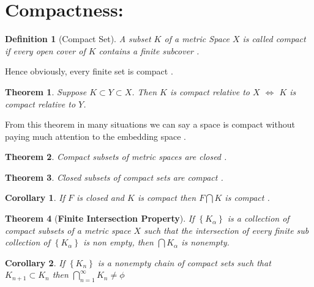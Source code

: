 \documentclass{article}
\newcommand{\set}[1]{\left\{#1\right\}}
\newtheorem{theorem}{Theorem}[section]
\newtheorem{defn}{Definition}[section]
\newtheorem{corollary}{Corollary}[theorem]
\begin{document}
\section{Compactness:}
\begin{defn}[Compact Set] A subset $K$ of a metric Space $X$ is called compact if every open cover of $K$ contains a finite subcover . 
\end{defn}
Hence obviously, every finite set is compact . \begin{theorem}
 Suppose $K \subset Y \subset X$. Then $K$ is compact relative to  $X$
$\iff$ $K$ is compact relative to $Y$.
\end{theorem}
From this theorem in many situations we can say a space is compact without paying much attention to the embedding space . 
\begin{theorem}
	Compact subsets of metric spaces are closed .
\end{theorem}
\begin{theorem}
	Closed subsets of compact sets are compact .
\end{theorem}
\begin{corollary}
	If $F$ is closed and $K$ is compact then $F\bigcap K$ is compact .
\end{corollary}
\begin{theorem}
	[\textbf{Finite Intersection Property}] If $\set{K_{\alpha}}$ is a collection of compact subsets of a metric space  $X$ such that the intersection of every finite sub collection of $\set{K_{\alpha}}$ is non empty, then $\bigcap K_{\alpha}$ is nonempty.
\end{theorem}
\begin{corollary}
	If $\set{K_{n}}$ is a nonempty chain of compact sets such that $K_{n+1}\subset K_n$ then $\bigcap_{n=1}^{\infty} K_n\neq \phi $ 
\end{corollary}
\end{document}
